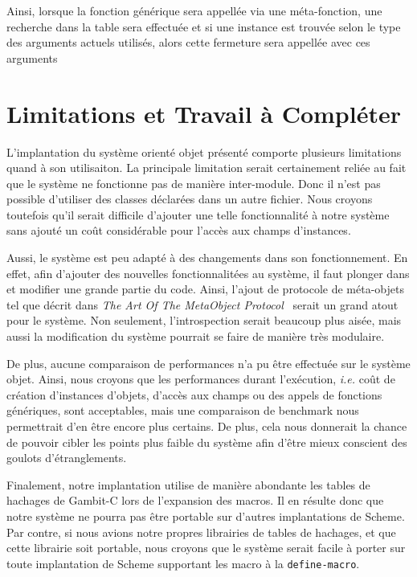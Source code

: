      Ainsi, lorsque la fonction générique sera appellée via une
      méta-fonction, une recherche dans la table sera effectuée et si
      une instance est trouvée selon le type des arguments actuels
      utilisés, alors cette fermeture sera appellée avec ces arguments
    



 
\section{Limitations et Travail à Compléter}
  L'implantation du système orienté objet présenté comporte plusieurs
  limitations quand à son utilisaiton. La principale limitation serait
  certainement reliée au fait que le système ne fonctionne pas de
  manière inter-module. Donc il n'est pas possible d'utiliser des
  classes déclarées dans un autre fichier. Nous croyons toutefois
  qu'il serait difficile d'ajouter une telle fonctionnalité à notre
  système sans ajouté un coût considérable pour l'accès aux champs
  d'instances.

  Aussi, le système est peu adapté à des changements dans son
  fonctionnement. En effet, afin d'ajouter des nouvelles
  fonctionnalitées au système, il faut plonger dans et modifier une
  grande partie du code. Ainsi, l'ajout de protocole de méta-objets
  tel que décrit dans \textit{The Art Of The MetaObject
    Protocol}~\cite{AOMOP} serait un grand atout pour le système. Non
  seulement, l'introspection serait beaucoup plus aisée, mais aussi la
  modification du système pourrait se faire de manière très modulaire.

  De plus, aucune comparaison de performances n'a pu être effectuée
  sur le système objet. Ainsi, nous croyons que les performances
  durant l'exécution, \textit{i.e.} coût de création d'instances
  d'objets, d'accès aux champs ou des appels de fonctions génériques,
  sont acceptables, mais une comparaison de \og benchmark \fg nous
  permettrait d'en être encore plus certains. De plus, cela nous
  donnerait la chance de pouvoir cibler les points plus faible du
  système afin d'être mieux conscient des goulots d'étranglements.

  Finalement, notre implantation utilise de manière abondante les
  tables de hachages de Gambit-C lors de l'expansion des macros. Il en
  résulte donc que notre système ne pourra pas être portable sur
  d'autres implantations de Scheme. Par contre, si nous avions notre
  propres librairies de tables de hachages, et que cette librairie
  soit portable, nous croyons que le système serait facile à porter
  sur toute implantation de Scheme supportant les macro à la
  \texttt{define-macro}.

